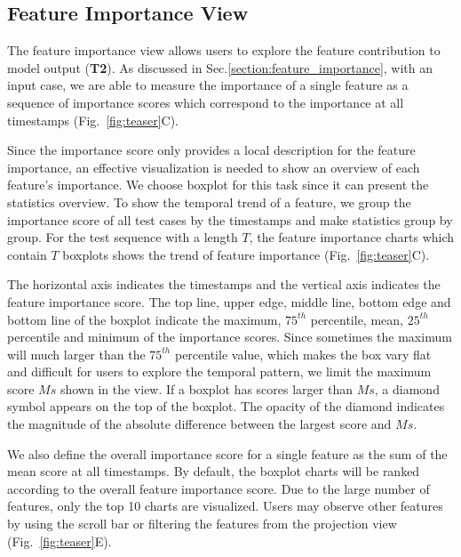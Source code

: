 \subsection{Feature Importance View}
The feature importance view allows users to explore the feature contribution to model output (\textbf{T2}).
As discussed in Sec.\ref{section:feature_importance}, with an input case, we are able to measure the importance of a single feature as a sequence of importance scores which correspond to the importance at all timestamps (Fig.~\ref{fig:teaser}C). 

Since the importance score only provides a local description for the feature importance, an effective visualization is needed to show an overview of each feature's importance. We choose boxplot for this task since it can present the statistics overview. To show the temporal trend of a feature, we group the importance score of all test cases by the timestamps and make statistics group by group. For the test sequence with a length $T$, the feature importance charts which contain $T$ boxplots shows the trend of feature importance (Fig.~\ref{fig:teaser}C).

The horizontal axis indicates the timestamps and the vertical axis indicates the feature importance score. The top line, upper edge, middle line, bottom edge and bottom line of the boxplot indicate the maximum,  $75^{th}$ percentile, mean, $25^{th}$ percentile and minimum of the importance scores.  Since sometimes the maximum will much larger than the $75^{th}$  percentile value, which makes the box vary flat and difficult for users to explore the temporal pattern, we limit the maximum score $Ms$ shown in the view. If a boxplot has scores larger than $Ms$, a diamond symbol appears on the top of the boxplot. The opacity of the diamond indicates the magnitude of the absolute difference between the largest score and $Ms$.    

We also define the overall importance score for a single feature as the sum of the mean score at all timestamps. By default, the boxplot charts will be ranked according to the overall feature importance score. 
Due to the large number of features, only the top 10 charts are visualized. Users may observe other features by using the scroll bar or filtering the features from the projection view (Fig.~\ref{fig:teaser}E). 

